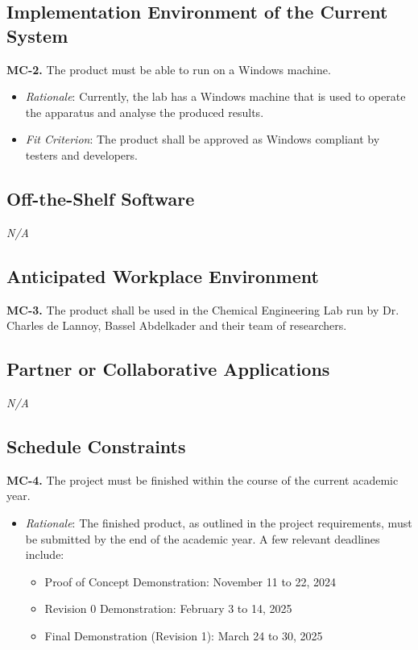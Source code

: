 \documentclass[12pt]{article}
\begin{document}
\subsection{Implementation Environment of the Current System}
\textbf{MC-2.} The product must be able to run on a Windows machine.
\begin{itemize}
  \item \emph{Rationale}: Currently, the lab has a Windows machine that is used to operate the apparatus and analyse the produced results.
  \item \emph{Fit Criterion}: The product shall be approved as Windows compliant by testers and developers.
\end{itemize}

\subsection{Off-the-Shelf Software}
\emph{N/A}

\subsection{Anticipated Workplace Environment}
\textbf{MC-3.} The product shall be used in the Chemical Engineering Lab run by Dr. Charles de Lannoy, Bassel Abdelkader and their team of researchers.

\subsection{Partner or Collaborative Applications}
\emph{N/A}

\subsection{Schedule Constraints}
\textbf{MC-4.} The project must be finished within the course of the current academic year.
\begin{itemize}
  \item \emph{Rationale}: The finished product, as outlined in the project requirements, must be submitted by the end of the academic year.
  A few relevant deadlines include:
  \begin{itemize}
    \item Proof of Concept Demonstration: November 11 to 22, 2024
    \item Revision 0 Demonstration: February 3 to 14, 2025
    \item Final Demonstration (Revision 1): March 24 to 30, 2025
  \end{itemize}
\end{itemize}
\end{document}
